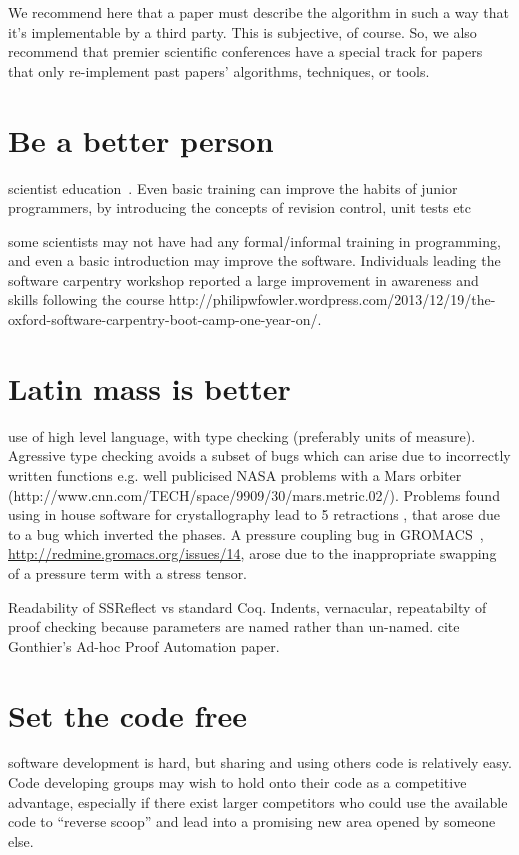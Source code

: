 \documentclass[conference]{IEEEtran}
\begin{document}
We recommend here that a paper must describe the algorithm in such a
way that it's implementable by a third party. This is subjective, of
course. So, we also recommend that premier scientific conferences have
a special track for papers that only re-implement past papers'
algorithms, techniques, or tools.



\section{Be a better person}

scientist education~\cite{Wilson2014}. Even basic training can improve
the habits of junior programmers, by introducing the concepts of
revision control, unit tests etc

some scientists may not have had any formal/informal training in programming, and even a basic introduction may improve the software. Individuals leading the software carpentry workshop reported a large improvement in awareness and skills following the course http://philipwfowler.wordpress.com/2013/12/19/the-oxford-software-carpentry-boot-camp-one-year-on/.


\section{Latin mass is better}

use of high level language, with type checking (preferably units of
measure). Agressive type checking avoids a subset of bugs which can
arise due to incorrectly written functions e.g. well publicised NASA
problems with a Mars orbiter
(http://www.cnn.com/TECH/space/9909/30/mars.metric.02/). Problems
found using in house software for crystallography lead to 5
retractions \cite{Miller2006}, that arose due to a bug which inverted
the phases. A pressure coupling bug in GROMACS~\cite{Hess2008},
\url{http://redmine.gromacs.org/issues/14}, arose due to the
inappropriate swapping of a pressure term with a stress tensor.

Readability of SSReflect vs standard Coq. Indents, vernacular, repeatabilty of proof checking because parameters are named rather than un-named. 
cite Gonthier's Ad-hoc Proof Automation paper. 

\section{Set the code free} 

software development is hard, but sharing and using others code is
relatively easy. Code developing groups may wish to hold onto their
code as a competitive advantage, especially if there exist larger
competitors who could use the available code to ``reverse scoop'' and
lead into a promising new area opened by someone else.
\end{document}
